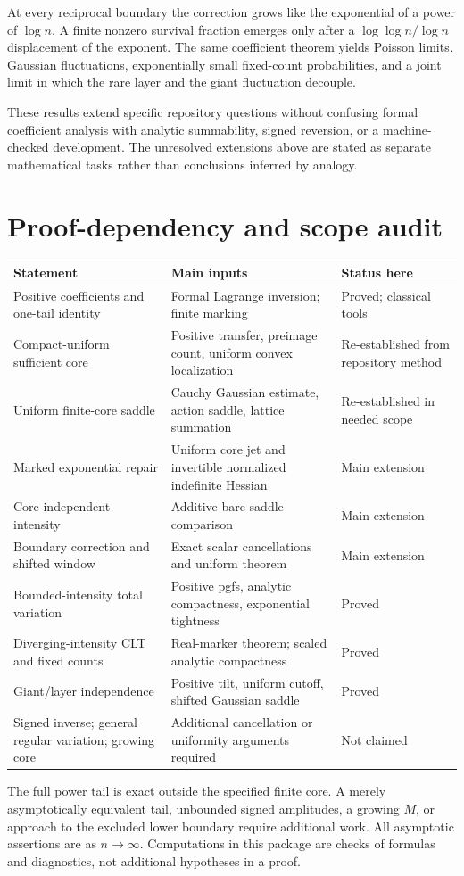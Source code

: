 \documentclass[11pt,a4paper]{article}
\numberwithin{equation}{section}
\theoremstyle{definition}
\theoremstyle{remark}
\begin{document}
At every reciprocal boundary the correction grows like the exponential of a
power of $\log n$. A finite nonzero survival fraction emerges only after a
$\log\log n/\log n$ displacement of the exponent. The same coefficient
theorem yields Poisson limits, Gaussian fluctuations, exponentially small
fixed-count probabilities, and a joint limit in which the rare layer and
the giant fluctuation decouple.

These results extend specific repository questions without confusing formal
coefficient analysis with analytic summability, signed reversion, or a
machine-checked development. The unresolved extensions above are stated as
separate mathematical tasks rather than conclusions inferred by analogy.

\appendix
\section{Proof-dependency and scope audit}
\label{app:audit}
\begin{longtable}{>{\raggedright\arraybackslash}p{}
                  >{\raggedright\arraybackslash}p{}
                  >{\raggedright\arraybackslash}p{}}
\toprule
Statement & Main inputs & Status here\\
\midrule\endhead
Positive coefficients and one-tail identity & Formal Lagrange inversion;
finite marking & Proved; classical tools\\[5pt]
Compact-uniform sufficient core & Positive transfer, preimage count,
uniform convex localization & Re-established from repository method\\[5pt]
Uniform finite-core saddle & Cauchy Gaussian estimate, action saddle,
lattice summation & Re-established in needed scope\\[5pt]
Marked exponential repair & Uniform core jet and invertible normalized
indefinite Hessian & Main extension\\[5pt]
Core-independent intensity & Additive bare-saddle comparison & Main extension\\[5pt]
Boundary correction and shifted window & Exact scalar cancellations and
uniform theorem & Main extension\\[5pt]
Bounded-intensity total variation & Positive pgfs, analytic compactness,
exponential tightness & Proved\\[5pt]
Diverging-intensity CLT and fixed counts & Real-marker theorem; scaled
analytic compactness & Proved\\[5pt]
Giant/layer independence & Positive tilt, uniform cutoff, shifted Gaussian
saddle & Proved\\[5pt]
Signed inverse; general regular variation; growing core & Additional
cancellation or uniformity arguments required & Not claimed\\
\bottomrule
\end{longtable}
The full power tail is exact outside the specified finite core. A merely
asymptotically equivalent tail, unbounded signed amplitudes, a growing $M$,
or approach to the excluded lower boundary require additional work.
All asymptotic assertions are as $n\to\infty$. Computations in this package
are checks of formulas and diagnostics, not additional hypotheses in a proof.
\end{document}
